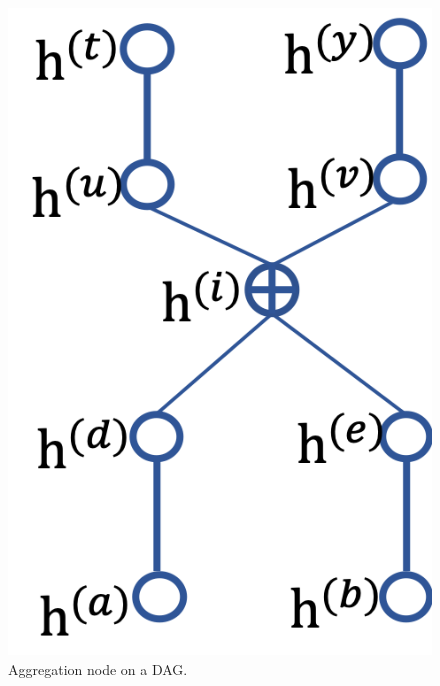 \documentclass[twoside]{article}
\begin{document}
\begin{figure}[H]
\begin{center}
 \includegraphics[width=0.23\linewidth]{fig/dag_aggr.png}
\end{center}
\caption{ {\small  Aggregation node on a DAG.}}
\label{fig:dag_aggr}
\end{figure}
\end{document}
